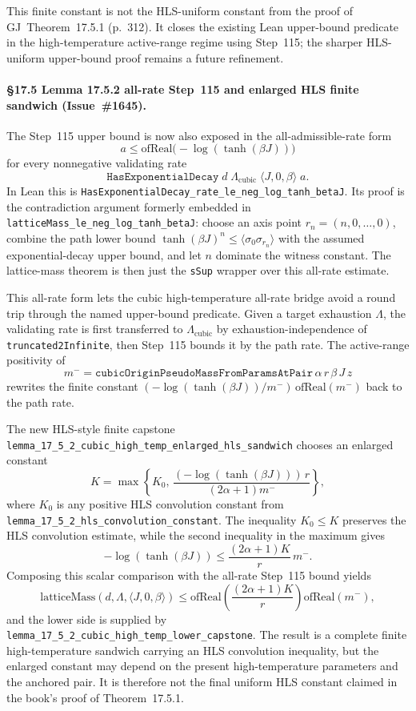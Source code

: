 \documentclass[a4paper,11pt]{article}
\begin{document}
This finite constant is not the HLS-uniform constant from the proof of
GJ~Theorem~17.5.1 (p.~312).  It closes the existing Lean upper-bound
predicate in the high-temperature active-range regime using Step~115; the
sharper HLS-uniform upper-bound proof remains a future refinement.

\paragraph{\S17.5 Lemma 17.5.2 all-rate Step~115 and enlarged HLS finite
sandwich (Issue~\#1645).} The Step~115 upper bound is now also exposed in the
all-admissible-rate form
\[
  a \le \mathrm{ofReal}\bigl(-\log(\tanh(\beta J))\bigr)
\]
for every nonnegative validating rate
\[
  \texttt{HasExponentialDecay}\;
    d\;\Lambda_{\mathrm{cubic}}\;\langle J,0,\beta\rangle\;a.
\]
In Lean this is
\texttt{HasExponentialDecay\_rate\_le\_neg\_log\_tanh\_betaJ}.  Its proof is
the contradiction argument formerly embedded in
\texttt{latticeMass\_le\_neg\_log\_tanh\_betaJ}: choose an axis point
\(r_n=(n,0,\ldots,0)\), combine the path lower bound
\(\tanh(\beta J)^n\le \langle\sigma_0\sigma_{r_n}\rangle\) with the assumed
exponential-decay upper bound, and let \(n\) dominate the witness constant.
The lattice-mass theorem is then just the \texttt{sSup} wrapper over this
all-rate estimate.

This all-rate form lets the cubic high-temperature all-rate bridge avoid a
round trip through the named upper-bound predicate.  Given a target exhaustion
\(\Lambda\), the validating rate is first transferred to
\(\Lambda_{\mathrm{cubic}}\) by exhaustion-independence of
\texttt{truncated2Infinite}, then Step~115 bounds it by the path rate.  The
active-range positivity of
\[
  m^-=\texttt{cubicOriginPseudoMassFromParamsAtPair}\,\alpha\,r\,\beta\,J\,z
\]
rewrites the finite constant
\((-\log(\tanh(\beta J))/m^-)\,\mathrm{ofReal}(m^-)\) back to the path rate.

The new HLS-style finite capstone
\texttt{lemma\_17\_5\_2\_cubic\_high\_temp\_enlarged\_hls\_sandwich}
chooses an enlarged constant
\[
  K=\max\left\{K_0,\,
    \frac{(-\log(\tanh(\beta J)))\,r}{(2\alpha+1)m^-}\right\},
\]
where \(K_0\) is any positive HLS convolution constant from
\texttt{lemma\_17\_5\_2\_hls\_convolution\_constant}.  The inequality
\(K_0\le K\) preserves the HLS convolution estimate, while the second
inequality in the maximum gives
\[
  -\log(\tanh(\beta J))
  \le \frac{(2\alpha+1)K}{r}\,m^-.
\]
Composing this scalar comparison with the all-rate Step~115 bound yields
\[
  \mathrm{latticeMass}(d,\Lambda,\langle J,0,\beta\rangle)
  \le
  \mathrm{ofReal}\!\left(\frac{(2\alpha+1)K}{r}\right)
  \mathrm{ofReal}(m^-),
\]
and the lower side is supplied by
\texttt{lemma\_17\_5\_2\_cubic\_high\_temp\_lower\_capstone}.  The result is a
complete finite high-temperature sandwich carrying an HLS convolution
inequality, but the enlarged constant may depend on the present
high-temperature parameters and the anchored pair.  It is therefore not the
final uniform HLS constant claimed in the book's proof of
Theorem~17.5.1.
\end{document}
